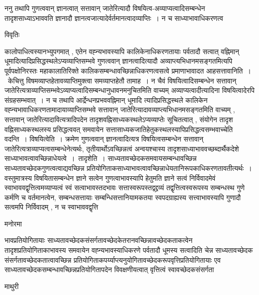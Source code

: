 \documentclass[10pt, openany]{book}
\begin{document}
{{\la ननु तथापि गुणत्ववान् ज्ञानत्वात् सत्तावान् जातेरित्यादौ विषयित्व-अव्याप्यत्वादिसम्बन्धेन तादृशसाध्याऽभाववति ज्ञानादौ ज्ञानत्वजात्यादेर्वर्तमानत्वादव्याप्तिः~। न च साध्याभावाधिकरणत्व}
\begin{center}     विवृतिः \end{center}
कालोपाधित्वस्यानभ्युपगमात् , एतेन वह्न्यभावस्यापि कालिकेनाधिकरणतायाः पर्वतादौ सत्वात् वह्निमान् धूमादित्यादिप्रसिद्धस्थलेऽप्यव्याप्तिसम्भवे गुणत्ववान् ज्ञानत्वादित्यादौ अव्याप्त्यभिधानमसङ्गतमित्यपि पूर्वपक्षोनिरस्तः महाकालातिरिक्ते कालिकसम्बन्धावच्छिन्नाधिकरणत्वसत्वे प्रमाणाभावादत आह\textendash सत्तावानिति~।~{\la केचित्तु} विषमव्याप्तहेतावव्याप्तिमुक्त्वा समव्याप्तहेतौ तामाह~। न चैवं विषयित्वादिसम्बन्धेन सत्तावान् जातेरित्यत्राव्याप्तिसम्भवेऽव्याप्यत्वादिसम्बन्धानुधावनमनुचितमिति वाच्यम् अव्याप्यत्वादीत्यादिना विषयित्वादेरपि संग्रहसम्भवात्~। न च तथापि आर्द्रेन्धनप्रभववह्निमान्
धूमादि त्यादिप्रसिद्धस्थले कालिकेन वह्न्यभावाधिकरणतामादायाव्याप्तिसम्भवे सत्तावान् जातेरित्यादावव्याप्त्यभिधानमसङ्गतमिति वाच्यम् , सत्तावान् जातेरित्यादावित्यत्रादिपदेन तादृशवह्निसाध्यकस्थलेऽप्यव्याप्तेः सूचितत्वात् , संयोगेन तादृश वह्निसाध्यकस्थलस्य प्रसिद्धत्ववत् समवायेन
सत्तासाध्यकजातिहेतुकस्थलस्यापिप्रसिद्धत्वसम्भवाच्चेति वदन्ति~। विषयित्वेति~। क्रमेण गुणत्ववान् ज्ञानत्वादित्यत्र विषयित्वसम्बन्धेन सत्तावान् जातेरित्यत्राव्याप्यत्वसम्बन्धेनेत्यर्थः, तृतीयार्थोऽवच्छिन्नत्वं अन्वयश्चास्य तादृशसाध्याभाववच्छब्दार्थैकदेशे साध्याभावत्वावच्छिन्नाधेयत्वे~।~{\la तादृशेति~।}
साध्यतावच्छेदकसमवायसम्बन्धावच्छिन्न साध्यतावच्छेदकगुणत्वत्वाद्यवच्छिन्न प्रतियोगिताकसाध्याभावत्वावच्छिन्नाधेयतानिरूपकाधिकरणतावतीत्यर्थः~। वस्तुमात्रस्य विषयितासम्बन्धेन ज्ञाने सत्वेन गुणत्वाभावस्यापि हेतुमति ज्ञाने सत्वं निर्विवादमेवं स्वाभाववद्वृत्तित्वमव्याप्यत्वं स्वं सत्वाभावस्तदभावः सत्तास्वरूपस्तद्वद्द्रव्यं तद्वृत्तित्वस्वरूपस्य सम्बन्धस्थ  गुणे कर्मणि च वर्तमानत्वेन, सम्बन्धसत्तायाः सम्बन्धिसत्तानियामकतया स्वपदग्राह्यस्य सत्त्वाभावस्यापि गुणादौ सत्वमपि निर्विवादम् , न च
स्वाभाववद्वृत्ति\textendash
\begin{center}   मनोरमा  \end{center}
भावप्रतियोगितायाः साध्यतावच्छेदकसंसर्गतावच्छेदकेतरानवच्छिन्नावच्छेदकताकत्वेन तादृशप्रतियोगिताकाभावस्य समवायेन वह्न्यभावस्याधिकरणे पर्वतादौ धूमस्य सत्वादिति चेन्न साध्यतावच्छेदक संसर्गतावच्छेदकतात्वावच्छिन्न प्रतियोगिताकपर्य्याप्त्यनुयोगितावच्छेदकरूपवृत्तिप्रतियोगितायाः एव साध्यतावच्छेदकसम्बन्धावच्छिन्नप्रतियोगितापदेन विवक्षणीयत्वात् वृत्तित्वं स्वावच्छेदकसंसर्गता
\newpage
\begin{center}  माथुरी  \end{center}
}
\end{document}
